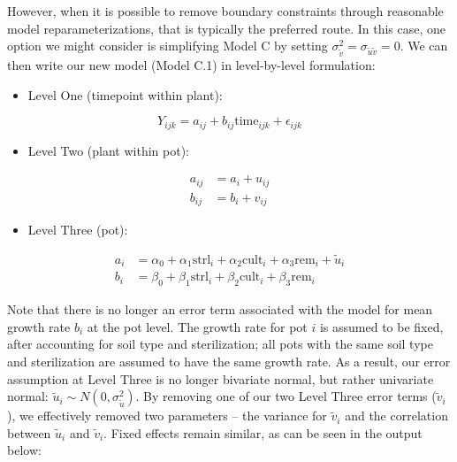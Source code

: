 \documentclass[
]{krantz}
\providecommand{\tightlist}{%
  \setlength{\itemsep}{0pt}\setlength{\parskip}{0pt}}
\begin{document}
However, when it is possible to remove boundary constraints through reasonable model reparameterizations, that is typically the preferred route. In this case, one option we might consider is simplifying Model C by setting \(\sigma_{\tilde{v}}^{2}=\sigma_{\tilde{u}\tilde{v}}=0\). We can then write our new model (Model C.1) in level-by-level formulation:

\begin{itemize}
\tightlist
\item
  Level One (timepoint within plant):
\end{itemize}

\begin{equation*}
Y_{ijk} = a_{ij}+b_{ij}\textrm{time}_{ijk}+\epsilon_{ijk}
\end{equation*}

\begin{itemize}
\tightlist
\item
  Level Two (plant within pot):
\end{itemize}

\begin{align*}
a_{ij} & = a_{i}+u_{ij} \\
b_{ij} & = b_{i}+v_{ij}
\end{align*}

\begin{itemize}
\tightlist
\item
  Level Three (pot):
\end{itemize}

\begin{align*}
a_{i} & = \alpha_{0}+\alpha_{1}\textrm{strl}_{i}+\alpha_{2}\textrm{cult}_{i}+\alpha_{3}\textrm{rem}_{i}+\tilde{u}_{i} \\
b_{i} & = \beta_{0}+\beta_{1}\textrm{strl}_{i}+\beta_{2}\textrm{cult}_{i}+\beta_{3}\textrm{rem}_{i}
\end{align*}

Note that there is no longer an error term associated with the model for mean growth rate \(b_{i}\) at the pot level. The growth rate for pot \(i\) is assumed to be fixed, after accounting for soil type and sterilization; all pots with the same soil type and sterilization are assumed to have the same growth rate. As a result, our error assumption at Level Three is no longer bivariate normal, but rather univariate normal: \(\tilde{u}_{i}\sim N(0,\sigma_{\tilde{u}}^{2})\). By removing one of our two Level Three error terms (\(\tilde{v}_{i}\)), we effectively removed two parameters -- the variance for \(\tilde{v}_{i}\) and the correlation between \(\tilde{u}_{i}\) and \(\tilde{v}_{i}\). Fixed effects remain similar, as can be seen in the output below:
\end{document}
